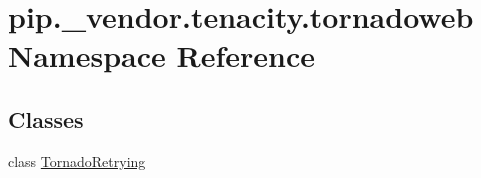 \hypertarget{namespacepip_1_1__vendor_1_1tenacity_1_1tornadoweb}{}\section{pip.\+\_\+vendor.\+tenacity.\+tornadoweb Namespace Reference}
\label{namespacepip_1_1__vendor_1_1tenacity_1_1tornadoweb}
\subsection*{Classes}
\begin{DoxyCompactItemize}
\item 
class \hyperlink{classpip_1_1__vendor_1_1tenacity_1_1tornadoweb_1_1TornadoRetrying}{Tornado\+Retrying}
\end{DoxyCompactItemize}
